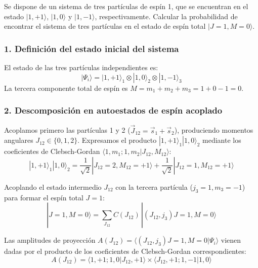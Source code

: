 \begin{problema}
Se dispone de un sistema de tres partículas de espín 1, que se encuentran en el estado $|1, +1\rangle$, $|1, 0\rangle$ y $|1, -1\rangle$, respectivamente. Calcular la probabilidad de encontrar el sistema de tres partículas en el estado de espín total $|J=1, M=0\rangle$.

\tcblower

\subsubsection*{1. Definición del estado inicial del sistema}

El estado de las tres partículas independientes es:
\begin{equation*}
|\Psi_i\rangle = |1, +1\rangle_1 \otimes |1, 0\rangle_2 \otimes |1, -1\rangle_3
\end{equation*}
La tercera componente total de espín es $M = m_1 + m_2 + m_3 = 1 + 0 - 1 = 0$.

\subsubsection*{2. Descomposición en autoestados de espín acoplado}

Acoplamos primero las partículas 1 y 2 ($\vec{J}_{12} = \vec{s}_1 + \vec{s}_2$), produciendo momentos angulares $J_{12} \in \{0, 1, 2\}$. Expresamos el producto $|1, +1\rangle_1 |1, 0\rangle_2$ mediante los coeficientes de Clebsch-Gordan $\langle 1, m_1; 1, m_2 | J_{12}, M_{12} \rangle$:
\begin{equation*}
|1, +1\rangle_1 |1, 0\rangle_2 = \frac{1}{\sqrt{2}} |J_{12}=2, M_{12}=+1\rangle + \frac{1}{\sqrt{2}} |J_{12}=1, M_{12}=+1\rangle
\end{equation*}

Acoplando el estado intermedio $J_{12}$ con la tercera partícula ($j_3 = 1, m_3 = -1$) para formar el espín total $J = 1$:
\begin{equation*}
|J=1, M=0\rangle = \sum_{J_{12}} C(J_{12}) \, |(J_{12}, j_3) J=1, M=0\rangle
\end{equation*}

Las amplitudes de proyección $A(J_{12}) = \langle (J_{12}, j_3) J=1, M=0 | \Psi_i \rangle$ vienen dadas por el producto de los coeficientes de Clebsch-Gordan correspondientes:
\begin{equation*}
A(J_{12}) = \langle 1, +1; 1, 0 | J_{12}, +1 \rangle \times \langle J_{12}, +1; 1, -1 | 1, 0 \rangle
\end{equation*}


\end{problema}
